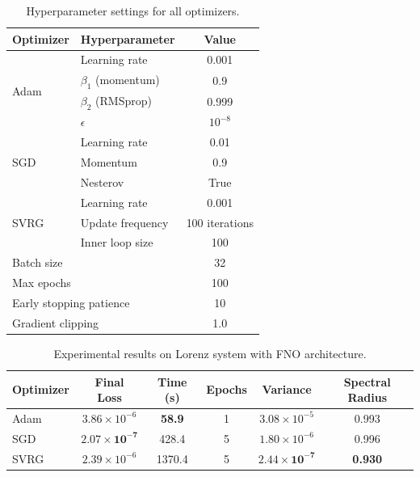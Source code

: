 \begin{table}[htbp]
\centering
\caption{Hyperparameter settings for all optimizers.}
\label{tab:hyperparameters}
\begin{tabular}{llc}
\toprule
Optimizer & Hyperparameter & Value \\
\midrule
\multirow{4}{*}{Adam} 
  & Learning rate & 0.001 \\
  & $\beta_1$ (momentum) & 0.9 \\
  & $\beta_2$ (RMSprop) & 0.999 \\
  & $\epsilon$ & $10^{-8}$ \\
\midrule
\multirow{3}{*}{SGD}
  & Learning rate & 0.01 \\
  & Momentum & 0.9 \\
  & Nesterov & True \\
\midrule
\multirow{3}{*}{SVRG}
  & Learning rate & 0.001 \\
  & Update frequency & 100 iterations \\
  & Inner loop size & 100 \\
\midrule
\multicolumn{2}{l}{Batch size} & 32 \\
\multicolumn{2}{l}{Max epochs} & 100 \\
\multicolumn{2}{l}{Early stopping patience} & 10 \\
\multicolumn{2}{l}{Gradient clipping} & 1.0 \\
\bottomrule
\end{tabular}
\end{table}

\begin{table}[htbp]
\centering
\caption{Experimental results on Lorenz system with FNO architecture.}
\label{tab:results_lorenz}
\begin{tabular}{lccccc}
\toprule
Optimizer & Final Loss & Time (s) & Epochs & Variance & Spectral Radius \\
\midrule
Adam  & $3.86 \times 10^{-6}$ & \textbf{58.9}  & 1 & $3.08 \times 10^{-5}$ & 0.993 \\
SGD   & $\mathbf{2.07 \times 10^{-7}}$ & 428.4 & 5 & $1.80 \times 10^{-6}$ & 0.996 \\
SVRG  & $2.39 \times 10^{-6}$ & 1370.4 & 5 & $\mathbf{2.44 \times 10^{-7}}$ & \textbf{0.930} \\
\bottomrule
\end{tabular}
\end{table}

